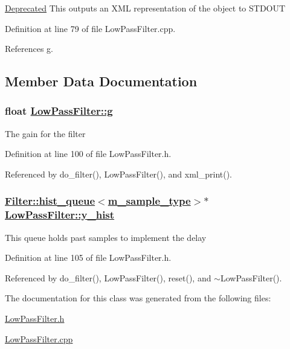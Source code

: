 \begin{Desc}
\item[\hyperlink{deprecated__deprecated000019}{Deprecated}]This outputs an XML representation of the object to STDOUT \end{Desc}


Definition at line 79 of file Low\-Pass\-Filter.cpp.

References g.

\subsection{Member Data Documentation}
\hypertarget{classLowPassFilter_r0}{
\subsubsection[g]{\setlength{\rightskip}{0pt plus 5cm}float \hyperlink{classLowPassFilter_r0}{Low\-Pass\-Filter::g}}}
\label{classLowPassFilter_r0}


The gain for the filter 

Definition at line 100 of file Low\-Pass\-Filter.h.

Referenced by do\_\-filter(), Low\-Pass\-Filter(), and xml\_\-print().\hypertarget{classLowPassFilter_r1}{
\subsubsection[y\_\-hist]{\setlength{\rightskip}{0pt plus 5cm}\hyperlink{classFilter_1_1hist__queue}{Filter::hist\_\-queue}$<$\hyperlink{Types_8h_a0}{m\_\-sample\_\-type}$>$$\ast$ \hyperlink{classLowPassFilter_r1}{Low\-Pass\-Filter::y\_\-hist}}}
\label{classLowPassFilter_r1}


This queue holds past samples to implement the delay 

Definition at line 105 of file Low\-Pass\-Filter.h.

Referenced by do\_\-filter(), Low\-Pass\-Filter(), reset(), and $\sim$Low\-Pass\-Filter().

The documentation for this class was generated from the following files:\begin{CompactItemize}
\item 
\hyperlink{LowPassFilter_8h}{Low\-Pass\-Filter.h}\item 
\hyperlink{LowPassFilter_8cpp}{Low\-Pass\-Filter.cpp}\end{CompactItemize}
